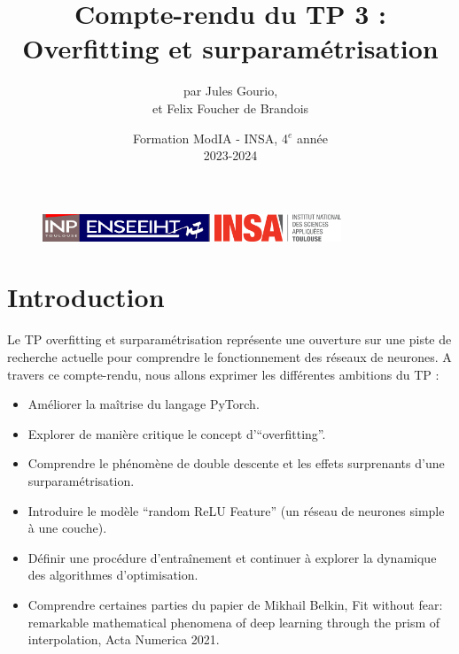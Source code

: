 \documentclass[12pt,a4paper]{article}
\begin{document}
\begin{figure}[t]
    \centering
    \includegraphics[width=5cm]{src/inp_n7.png}
    \hfill
    \includegraphics[width=3.8cm]{src/insa_toulouse.png}
\end{figure}

\title{\vspace{4cm} \textbf{Compte-rendu du TP 3 : \\ 
Overfitting et surparamétrisation}}

\author{par Jules Gourio, \\
        et Felix Foucher de Brandois}
        
\date{\vfill Formation ModIA - INSA, 4$^e$ année \\
2023-2024}

\maketitle

\newpage
\tableofcontents
\listoffigures

\newpage


\section{Introduction}
Le TP overfitting et surparamétrisation représente une ouverture sur une piste de recherche actuelle pour comprendre le fonctionnement des réseaux de neurones.
A travers ce compte-rendu, nous allons exprimer les différentes ambitions du TP :
\begin{itemize}
    \item Améliorer la maîtrise du langage PyTorch.
    \item Explorer de manière critique le concept d’“overfitting”.
    \item Comprendre le phénomène de double descente et les effets surprenants d’une surparamétrisation.
    \item Introduire le modèle “random ReLU Feature” (un réseau de neurones simple à une couche).
    \item Définir une procédure d’entraînement et continuer à explorer la dynamique des algorithmes d’optimisation.
    \item Comprendre certaines parties du papier de Mikhail Belkin, Fit without fear: remarkable mathematical phenomena of deep learning through the prism of interpolation, Acta Numerica 2021.
\end{itemize}
\end{document}
